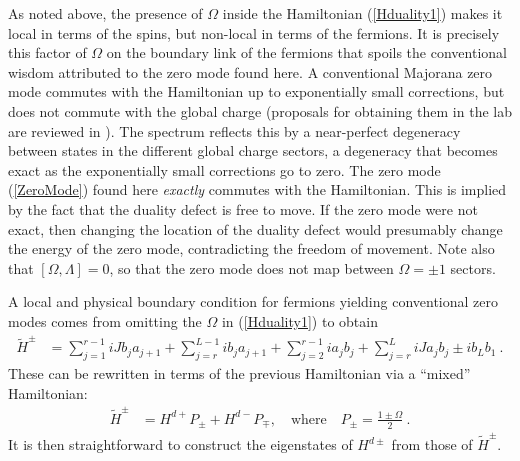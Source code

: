 \documentclass[11pt]{article}
\numberwithin{equation}{section}		%
\begin{document}
As noted above, the presence of $\Omega$ inside the Hamiltonian (\ref{Hduality1}) makes it local in terms of the spins, but non-local in terms of the fermions. 
It is precisely this factor of $\Omega$ on the boundary link of the fermions that spoils the conventional wisdom attributed to the zero mode found here. 
A conventional Majorana zero mode commutes with the Hamiltonian up to exponentially small corrections, but does not commute with the global charge (proposals for obtaining them in the lab are reviewed in \cite{Aliceareview}). 
The spectrum reflects this by a near-perfect degeneracy between states in the different global charge sectors,  a degeneracy that becomes exact as the exponentially small corrections go to zero.
The zero mode (\ref{ZeroMode}) found here \emph{exactly} commutes with the Hamiltonian.
This is implied by the fact that the duality defect is free to move. 
If the zero mode were not exact, then changing the location of the duality defect would presumably change the energy of the zero mode, contradicting the freedom of movement. 
Note also that $[\Omega,\Lambda]=0$, so that the zero mode does not map between $\Omega=\pm 1$ sectors.

A local and physical boundary condition for fermions yielding conventional zero modes comes from omitting the $\Omega$ in (\ref{Hduality1})
to obtain
\begin{align}
\tilde{H}^\pm &=  \sum_{j=1}^{r-1} i J b_j a_{j+1} + \sum_{j=r}^{L-1} i b_j a_{j+1}+\sum_{j =2}^{r-1} i  a_j b_j + \sum_{j=r}^{L} iJ a_j b_j \pm i b_L b_1\ .
\end{align}
These can be rewritten in terms of the previous Hamiltonian via a ``mixed'' Hamiltonian:
\begin{align}
\tilde{H}^{\pm} &= H^{d+}P_\pm + H^{d-} P_\mp,\quad \text{where} \quad P_\pm = \frac{1\pm \Omega}{2}\ .
\end{align}
It is then straightforward to construct the eigenstates of $H^{d\pm}$ from those of $\tilde{H}^{\pm}$.
\end{document}
